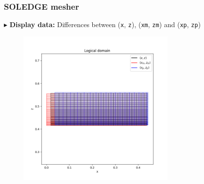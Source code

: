 \documentclass[t,10pt,a3paper]{beamer} %
\newenvironment{changemargin}[2]{%
 \begin{list}{}{%
     \setlength{\topsep}{0pt}%
     \setlength{\leftmargin}{#1}%
     \setlength{\rightmargin}{#2}%
     \setlength{\listparindent}{\parindent}%
     \setlength{\itemindent}{\parindent}%
     \setlength{\parsep}{\parskip}%
   }%
\item[]}{\end{list}}
\begin{document}
\begin{frame} %
\frametitle{\color{vert}\textbf{SOLEDGE mesher}}
\footnotesize	

{\color{vert}$\blacktriangleright$ }
\textbf{Display data:} Differences between (\verb|x|, \verb|z|), (\verb|xm|, \verb|zm|) and (\verb|xp|, \verb|zp|)
\begin{changemargin}{-2cm}{-2cm} 
\begin{center}
\begin{figure}[!h]
	\includegraphics[width=0.7\textwidth]{images/Diff_zwischen_x_xm_xp.png}
\end{figure}	
\end{center}
\end{changemargin}

\end{frame}
\end{document}
